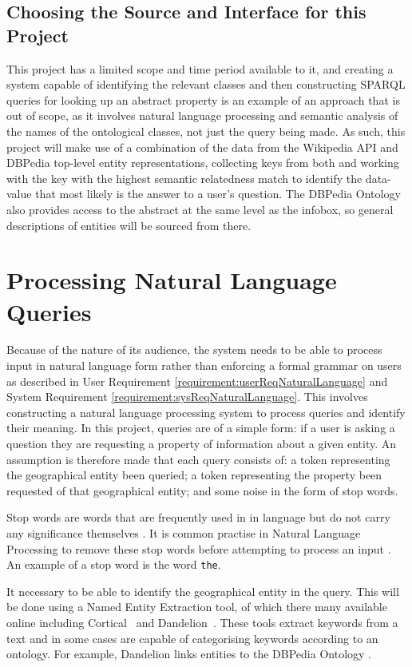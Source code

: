 \documentclass[authoryearcitations]{UoYCSproject}
\begin{document}
\subsection{Choosing the Source and Interface for this Project}
This project has a limited scope and time period available to it, and creating a system capable of identifying the relevant classes and then constructing SPARQL queries for looking up an abstract property is an example of an approach that is out of scope, as it involves natural language processing and semantic analysis of the names of the ontological classes, not just the query being made.  As such, this project will make use of a combination of the data from the Wikipedia API and DBPedia top-level entity representations, collecting keys from both and working with the key with the highest semantic relatedness match to identify the data-value that most likely is the answer to a user's question.  The DBPedia Ontology also provides access to the abstract at the same level as the infobox, so general descriptions of entities will be sourced from there.

\section{Processing Natural Language Queries}
Because of the nature of its audience, the system needs to be able to process input in natural language form rather than enforcing a formal grammar on users as described in User Requirement \ref{requirement:userReqNaturalLanguage} and System Requirement \ref{requirement:sysReqNaturalLanguage}. This involves constructing a natural language processing system to process queries and identify their meaning. In this project, queries are of a simple form: if a user is asking a question they are requesting a property of information about a given entity. An assumption is therefore made that each query consists of: a token representing the geographical entity been queried; a token representing the property been requested of that geographical entity; and some noise in the form of stop words.

Stop words are words that are frequently used in in language but do not carry any significance themselves \cite{dataMiningStopWords}. It is common practise in Natural Language Processing to remove these stop words before attempting to process an input \cite{dataMiningStopWords}. An example of a stop word is the word \texttt{the}.

It necessary to be able to identify the geographical entity in the query. This will be done using a Named Entity Extraction tool, of which there many available online including Cortical~\cite{serviceCorticalNex} and Dandelion~\cite{serviceDandelionNex}. These tools extract keywords from a text and in some cases are capable of categorising keywords according to an ontology. For example, Dandelion links entities to the DBPedia Ontology \cite{dandelionNex}.
\end{document}
